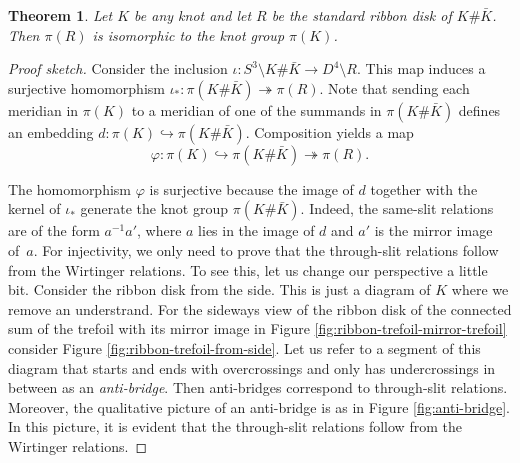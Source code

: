 \documentclass{article}
\newtheorem{theorem}{Theorem}[section]
\theoremstyle{definition}
\begin{document}
\begin{theorem}
Let $K$ be any knot and let $R$ be the standard ribbon disk of $K\#\bar{K}$. Then $\pi(R)$ is isomorphic to the knot group $\pi(K)$.
\end{theorem}

\begin{proof}[Proof sketch]
Consider the inclusion $\iota: S^3 \setminus K\#\bar K \rightarrow D^4 \setminus R$. This map induces a surjective homomorphism $\iota_*: \pi(K\#\bar K) \twoheadrightarrow \pi(R)$. Note that sending each meridian in $\pi(K)$ to a meridian of one of the summands in $\pi(K\#\bar K)$ defines an embedding $d: \pi(K) \hookrightarrow \pi(K\#\bar K)$. Composition yields a map 
$$\varphi: \pi(K) \hookrightarrow \pi(K\# \bar K) 
\twoheadrightarrow \pi(R).$$

The homomorphism $\varphi$ is surjective because the image of $d$ together with the kernel of $\iota_*$ generate the knot group $\pi(K\#\bar K)$. Indeed, the same-slit relations are of the form $a^{-1}a'$, where $a$ lies in the image of $d$ and $a'$ is the mirror image of~$a$. For injectivity, we only need to prove that the through-slit relations follow from the Wirtinger relations. To see this, let us change our perspective a little bit. Consider the ribbon disk from the side. This is just a diagram of $K$ where we remove an understrand. For the sideways view of the ribbon disk of the connected sum of the trefoil with its mirror image in Figure \ref{fig:ribbon-trefoil-mirror-trefoil} consider Figure \ref{fig:ribbon-trefoil-from-side}.
Let us refer to a segment of this diagram that starts and ends with overcrossings and only has undercrossings in between as an \textit{anti-bridge}. Then anti-bridges correspond to through-slit relations. Moreover, the qualitative picture of an anti-bridge is as in Figure \ref{fig:anti-bridge}.
In this picture, it is evident that the through-slit relations follow from the Wirtinger relations.
\end{proof}
\end{document}
